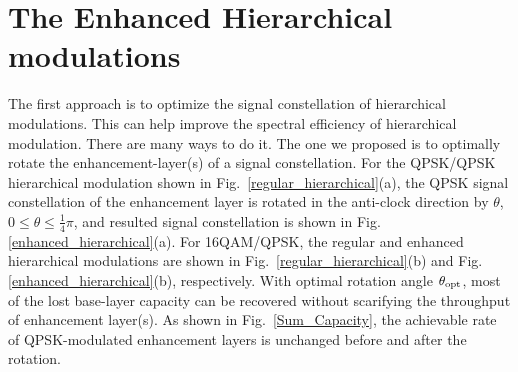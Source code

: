 \documentclass[10pt,fleqn, twocolumn]{IEEEtran}
\begin{document}
\section{The Enhanced Hierarchical modulations}
The first approach is to optimize the signal constellation of
hierarchical modulations. This can help improve the spectral
efficiency of hierarchical modulation. There are many ways to do
it. The one we proposed is to optimally rotate the
enhancement-layer(s) of a signal constellation. For the QPSK/QPSK
hierarchical modulation shown in
Fig.~\ref{regular_hierarchical}(a), the QPSK signal constellation
of the enhancement layer is rotated in the anti-clock direction by
$\theta$, $0\leq\theta\leq\frac{1}{4}\pi$, and resulted signal
constellation is shown in Fig. \ref{enhanced_hierarchical}(a). For
16QAM/QPSK, the regular and enhanced hierarchical modulations are
shown in Fig.~\ref{regular_hierarchical}(b) and Fig.
\ref{enhanced_hierarchical}(b), respectively.  With optimal
rotation angle $\theta_{\rm opt}$, most of the lost base-layer
capacity can be recovered without scarifying the throughput of
enhancement layer(s). As shown in Fig.~\ref{Sum_Capacity}, the
achievable rate of QPSK-modulated enhancement layers is unchanged
before and after the rotation.
\begin{figure}
\end{figure}
\end{document}
